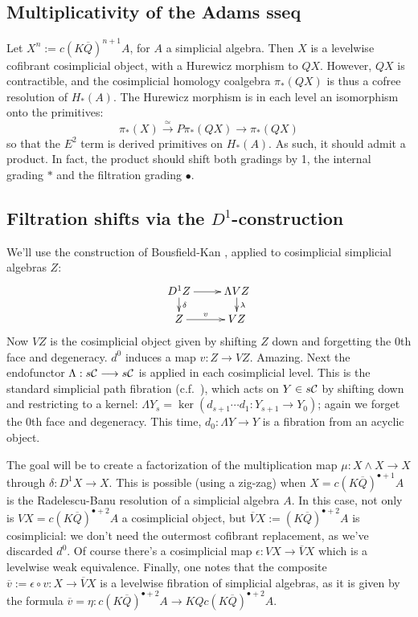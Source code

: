 \documentclass[10pt]{article}
\newcommand{\Comm}{\calC}
\begin{document}
\begin{Adams Muliplicativity}
\pagebreak
\section{Multiplicativity of the Adams sseq}
Let $X^n:=c(K\overline{Q})^{n+1}A$, for $A$ a simplicial algebra. Then $X$ is a levelwise cofibrant cosimplicial object, with a Hurewicz morphism to $QX$. However, $QX$ is contractible, and the cosimplicial homology coalgebra $\pi_*(QX)$ is thus a cofree resolution of $H_*(A)$. The Hurewicz morphism is in each level an isomorphism onto the primitives:
\[\pi_*(X)\overset{\simeq}{\to}P\pi_*(QX)\overset{}{\to}\pi_*(QX)\]
so that the $E^2$ term is derived primitives on $H_*(A)$. As such, it should admit a product. In fact, the product should shift both gradings by 1, the internal grading $*$ and the filtration grading $\bullet$.

\subsection{Filtration shifts via the $D^1$-construction}
We'll use the construction of Bousfield-Kan \cite{BK_pairings_products.pdf,BK_pairings.pdf}, applied to cosimplicial simplicial algebras $Z$:
\[\xymatrix@R=4mm{
D^1Z\ar[r]
\ar[d]^-{\delta}
&%
\Lambda VZ\ar[d]^-{\lambda}
\\%
Z\ar[r]^-{v}
&%
VZ%
}\]
Now $VZ$ is the cosimplicial object given by shifting $Z$ down and forgetting the 0th face and degeneracy. $d^0$ induces a map $v:Z\to VZ$. Amazing. Next the endofunctor $\Lambda:s\Comm\to s\Comm$ is applied in each cosimplicial level. This is the standard simplicial path fibration (c.f.\ \cite[p.82]{BousKanSSeq.pdf}), which acts on $Y\in s\Comm$ by shifting down and restricting to a kernel: $\Lambda Y_s=\ker(d_{s+1}\cdots d_1:Y_{s+1}\to Y_0)$; again we forget the 0th face and degeneracy. This time, $d_0:\Lambda Y\to Y$ is a fibration from an acyclic object.

The goal will be to create a factorization of the multiplication map $\mu:X\wedge  X\to X$ through $\delta:D^1X\to X$. This is possible (using a zig-zag) when $X=c(K\overline{Q})^{\bullet+1}A$ is the Radelescu-Banu resolution of a simplicial algebra $A$. In this case, not only is $VX=c(K\overline{Q})^{\bullet+2}A$ a cosimplicial object, but $\overline{V}X:=(K\overline{Q})^{\bullet+2}A$ is cosimplicial: we don't need the outermost cofibrant replacement, as we've discarded $d^0$. Of course there's a cosimplicial map $\epsilon:VX\to \overline{V}X$ which is a levelwise weak equivalence. Finally, one notes that the composite $\overline{v}:=\epsilon\circ v:X\to \overline{V}X$ is a levelwise fibration of simplicial algebras, as it is given by the formula $\overline{v}=\eta:c(K\overline{Q})^{\bullet+2}A\to KQc(K\overline{Q})^{\bullet+2}A$. 


\end{Adams Muliplicativity}
\end{document}
